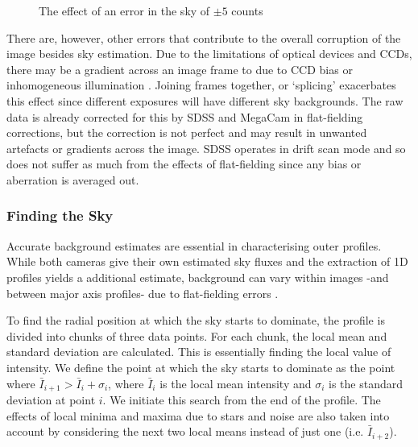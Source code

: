 \begin{figure}[h]
	\centering
	\caption{\footnotesize{The effect of an error in the sky of $\pm 5$ counts}}
	\label{fig: effects of sky}
\end{figure}
There are, however, other errors that contribute to the overall corruption of the image besides sky estimation. Due to the limitations of optical devices and CCDs, there may be a gradient across an image frame to due to CCD bias or inhomogeneous illumination \citep{olsen_radiometric_2010}. Joining frames together, or `splicing' exacerbates this effect since different exposures will have different sky backgrounds. The raw data is already corrected for this by SDSS and MegaCam in flat-fielding corrections, but the correction is not perfect and may result in unwanted artefacts or gradients across the image. SDSS operates in drift scan mode \citep{abazajian_seventh_2009} and so does not suffer as much from the effects of flat-fielding since any bias or aberration is averaged out.

\subsubsection{Finding the Sky}
Accurate background estimates are essential in characterising outer profiles. While both cameras give their own estimated sky fluxes and the extraction of 1D profiles yields a additional estimate, background can vary within images -and between major axis profiles- due to flat-fielding errors \citep{bijaoui_sky_1980}. 

To find the radial position at which the sky starts to dominate, the profile is divided into chunks of three data points. For each chunk, the local mean and standard deviation are calculated. This is essentially finding the local value of intensity. We define the point at which the sky starts to dominate as the point where $\bar{I}_{i+1} > \bar{I}_i + \sigma_i$, where $\bar{I}_i$ is the local mean intensity and $\sigma_i$ is the standard deviation at point $i$. We initiate this search from the end of the profile. The effects of local minima and maxima due to stars and noise are also taken into account by considering the next two local means instead of just one (i.e. $\bar{I}_{i+2}$).


